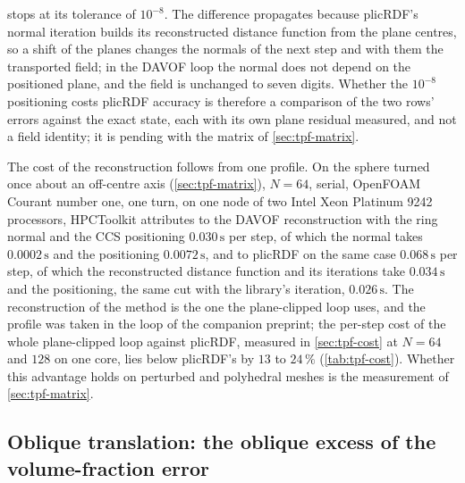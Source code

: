 \documentclass[preprint,12pt]{elsarticle}
\begin{document}
stops at its tolerance of $10^{-8}$. The difference propagates because plicRDF's normal iteration builds its reconstructed distance function from the plane centres, so a shift of the planes changes the normals of the next step and with them the transported field; in the DAVOF loop the normal does not depend on the positioned plane, and the field is unchanged to seven digits. Whether the $10^{-8}$ positioning costs plicRDF accuracy is therefore a comparison of the two rows' errors against the exact state, each with its own plane residual measured, and not a field identity; it is pending with the matrix of \cref{sec:tpf-matrix}.

The cost of the reconstruction follows from one profile. On the sphere turned once about an off-centre axis (\cref{sec:tpf-matrix}), $N = 64$, serial, OpenFOAM Courant number one, one turn, on one node of two Intel Xeon Platinum 9242 processors, HPCToolkit attributes to the DAVOF reconstruction with the ring normal and the CCS positioning $0.030\,\mathrm{s}$ per step, of which the normal takes $0.0002\,\mathrm{s}$ and the positioning $0.0072\,\mathrm{s}$, and to plicRDF on the same case $0.068\,\mathrm{s}$ per step, of which the reconstructed distance function and its iterations take $0.034\,\mathrm{s}$ and the positioning, the same cut with the library's iteration, $0.026\,\mathrm{s}$. The reconstruction of the method is the one the plane-clipped loop uses, and the profile was taken in the loop of the companion preprint; the per-step cost of the whole plane-clipped loop against plicRDF, measured in \cref{sec:tpf-cost} at $N = 64$ and $128$ on one core, lies below plicRDF's by $13$ to $24\,\%$ (\cref{tab:tpf-cost}). Whether this advantage holds on perturbed and polyhedral meshes is the measurement of \cref{sec:tpf-matrix}.

\subsection{Oblique translation: the oblique excess of the volume-fraction error}
\label{sec:tpf-oblique}


\end{document}
